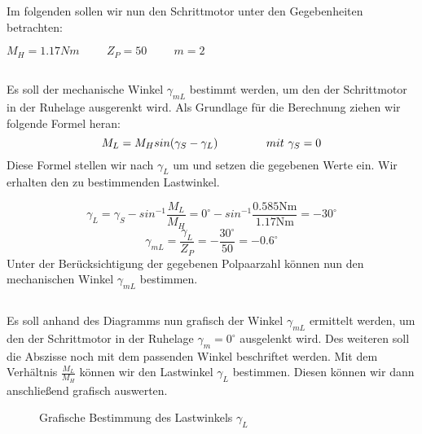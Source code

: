 \chapter{}\label{ch:aufg3}
Im folgenden sollen wir nun den Schrittmotor unter den Gegebenheiten betrachten:
\begin{center}
	$ M_{H} = 1.17Nm \hspace{1cm} Z_{P} = 50 \hspace{1cm} m = 2 $
\end{center}

\section{}\label{sec:3a}
Es soll der mechanische Winkel $ \gamma_{mL} $ bestimmt werden, um den der Schrittmotor in der Ruhelage ausgerenkt wird. Als Grundlage für die Berechnung ziehen wir folgende Formel heran:
\begin{equation}
	M_{L} = M_{H}sin(\gamma_{S}-\gamma_{L}) \hspace{1.5cm} mit~\gamma_{S} = 0
\end{equation}
Diese Formel stellen wir nach $ \gamma_{L} $ um und setzen die gegebenen Werte ein. Wir erhalten den zu bestimmenden Lastwinkel.

\begin{equation}
	\gamma_{L} = \gamma_{S} - sin^{-1}\frac{M_{L}}{M_{H}} = 0^{\circ} - sin^{-1}\frac{0.585\text{Nm}}{1.17\text{Nm}} = -30^{\circ}
\end{equation}
\begin{equation}
	\gamma_{mL} = \frac{\gamma_{L}}{Z_{P}} = -\frac{30^{\circ}}{50} = -0.6^{\circ}
\end{equation}
Unter der Berücksichtigung der gegebenen Polpaarzahl können nun den mechanischen Winkel $ \gamma_{mL} $ bestimmen.

\section{}\label{sec:3b}
Es soll anhand des Diagramms nun grafisch der Winkel $ \gamma_{mL} $ ermittelt werden, um den der Schrittmotor in der Ruhelage $ \gamma_{m} = 0^{\circ} $ ausgelenkt wird. Des weiteren soll die Abszisse noch mit dem passenden Winkel beschriftet werden. Mit dem Verhältnis $ \frac{M_{L}}{M_{H}} $ können wir den Lastwinkel $ \gamma_{L} $ bestimmen. Diesen können wir dann anschließend grafisch auswerten.
\begin{figure}[h]
	\centering
	
	\caption{Grafische Bestimmung des Lastwinkels $ \gamma_{L} $}
	\label{fig:3b:gamma}
\end{figure}

